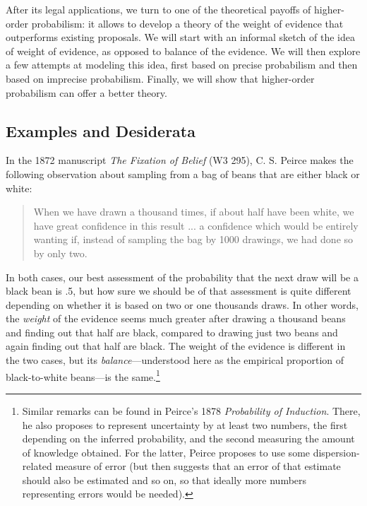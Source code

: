 \documentclass[
  10pt,
  dvipsnames,enabledeprecatedfontcommands]{scrartcl}
\begin{document}
\label{sec:weight}

After its legal applications, we turn to one of the theoretical payoffs
of higher-order probabilism: it allows to develop a theory of the weight
of evidence that outperforms existing proposals. We will start with an
informal sketch of the idea of weight of evidence, as opposed to balance
of the evidence. We will then explore a few attempts at modeling this
idea, first based on precise probabilism and then based on imprecise
probabilism. Finally, we will show that higher-order probabilism can
offer a better theory.

\hypertarget{examples-and-desiderata}{%
\subsection{Examples and Desiderata}\label{examples-and-desiderata}}

In the 1872 manuscript \emph{The Fixation of Belief} (W3 295), C. S.
Peirce makes the following observation about sampling from a bag of
beans that are either black or white:

\begin{quote} When we have drawn a thousand times, if about half have been white, we have great confidence in this result ... a confidence which would be entirely wanting if, instead of sampling the bag by 1000 drawings, we had done so by only two.
\end{quote}

\noindent In both cases, our best assessment of the probability that the
next draw will be a black bean is .5, but how sure we should be of that
assessment is quite different depending on whether it is based on two or
one thousands draws. In other words, the \emph{weight} of the evidence
seems much greater after drawing a thousand beans and finding out that
half are black, compared to drawing just two beans and again finding out
that half are black. The weight of the evidence is different in the two
cases, but its \emph{balance}---understood here as the empirical
proportion of black-to-white beans---is the same.\footnote{Similar
  remarks can be found in Peirce's 1878 \emph{Probability of Induction}.
  There, he also proposes to represent uncertainty by at least two
  numbers, the first depending on the inferred probability, and the
  second measuring the amount of knowledge obtained. For the latter,
  Peirce proposes to use some dispersion-related measure of error (but
  then suggests that an error of that estimate should also be estimated
  and so on, so that ideally more numbers representing errors would be
  needed).}
\end{document}
